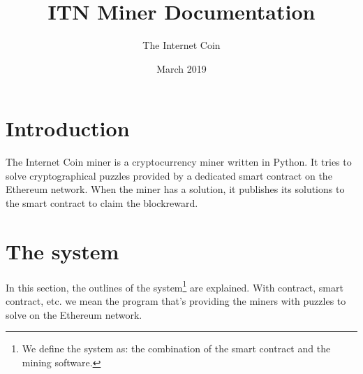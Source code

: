 \documentclass{article}
\title{ITN Miner Documentation}
\author{The Internet Coin}
\date{March 2019}
\begin{document}
\maketitle

\section{Introduction}
The Internet Coin miner is a cryptocurrency miner written in Python. It tries to solve cryptographical puzzles provided by a dedicated smart contract on the Ethereum network. When the miner has a solution, it publishes its solutions to the smart contract to claim the blockreward. 

\section{The system}
In this section, the outlines of the system\footnote{We define the system as: the combination of the smart contract and the mining software.} are explained. With contract, smart contract, etc. we mean the program that's providing the miners with puzzles to solve on the Ethereum network.
\end{document}
